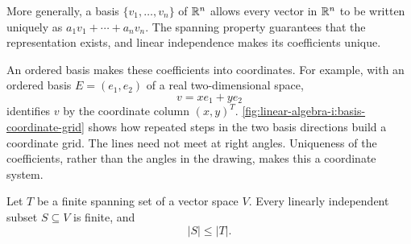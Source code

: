 More generally, a basis \(\{v_1,\ldots,v_n\}\) of \(\mathbb{R}^n\) allows
every vector in \(\mathbb{R}^n\) to be written uniquely as
\(a_1v_1+\cdots+a_nv_n\). The spanning property guarantees that the
representation exists, and linear independence makes its coefficients unique.

An ordered basis makes these coefficients into coordinates. For example,
with an ordered basis \(E=(e_1,e_2)\) of a real two-dimensional space,
\[
  v=xe_1+ye_2
\]
identifies \(v\) by the coordinate column \((x,y)^T\).
\autoref{fig:linear-algebra-i:basis-coordinate-grid} shows how repeated
steps in the two basis directions build a coordinate grid. The lines need
not meet at right angles. Uniqueness of the coefficients, rather than the
angles in the drawing, makes this a coordinate system.
\begin{marginfigure}
  \centering
  
  \caption[A basis builds a grid]{A real-plane schematic in the ordered
    basis \(E=(e_1,e_2)\). The marked vector has coordinates \((2,1)^T\),
    since it is two steps in the \(e_1\) direction and one in the
    \(e_2\) direction. Only integer grid lines are drawn.}
  \label{fig:linear-algebra-i:basis-coordinate-grid}
\end{marginfigure}

\begin{theorem}
  \label{thm:linear-algebra-i:comparison-independent-spanning}
  Let \(T\) be a finite spanning set of a vector space \(V\). Every
  linearly independent subset \(S\subseteq V\) is finite, and
  \[
    |S|\leq|T|.
  \]
\end{theorem}

